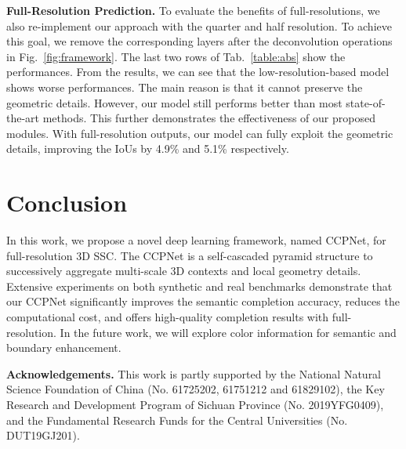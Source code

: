 \documentclass[10pt,twocolumn,letterpaper]{article}
\begin{document}
\vspace{-4mm}
\textbf{Full-Resolution Prediction.}
To evaluate the benefits of full-resolutions, we also re-implement our approach with the quarter and half resolution.
To achieve this goal, we remove the corresponding layers after the deconvolution operations in Fig.~\ref{fig:framework}.
The last two rows of Tab.~\ref{table:abs} show the performances.
From the results, we can see that the low-resolution-based model shows worse performances.
The main reason is that it cannot preserve the geometric details.
However, our model still performs better than most state-of-the-art methods.
This further demonstrates the effectiveness of our proposed modules.
With full-resolution outputs, our model can fully exploit the geometric details, improving the IoUs by 4.9\% and 5.1\% respectively.
\section{Conclusion}
In this work, we propose a novel deep learning framework, named CCPNet, for full-resolution 3D SSC.
The CCPNet is a self-cascaded pyramid structure to successively aggregate multi-scale 3D contexts and local geometry details.
Extensive experiments on both synthetic and real benchmarks demonstrate that our CCPNet significantly improves the semantic completion accuracy, reduces the computational cost, and offers high-quality completion results with full-resolution.
In the future work, we will explore color information for semantic and boundary enhancement.


\textbf{Acknowledgements.}
This work is partly supported by the National Natural Science Foundation of China (No. 61725202, 61751212 and 61829102), the Key Research and Development Program of Sichuan Province (No. 2019YFG0409), and the Fundamental Research Funds for the Central Universities (No. DUT19GJ201).

{\small


}
\end{document}
